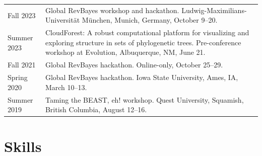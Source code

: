 \documentclass[10pt]{article}
\begin{document}
\begin{tabularx}{\textwidth}{>{\raggedleft\arraybackslash}p{2.2cm} X}
Fall 2023 & Global \textsf{RevBayes} workshop and hackathon. Ludwig-Maximilians-Universit\"{a}t M\"{u}nchen, Munich, Germany, October 9--20. \\[0.5cm]
Summer 2023 & CloudForest: A robust computational platform for visualizing and exploring structure in sets of phylogenetic trees. Pre-conference workshop at Evolution, Albuquerque, NM, June 21. \\[0.94cm]
Fall 2021 & Global \textsf{RevBayes} hackathon. Online-only, October 25--29. \\[0.1cm]
Spring 2020 & Global \textsf{RevBayes} hackathon. Iowa State University, Ames, IA, March 10--13. \\[0.1cm]
Summer 2019 & Taming the BEAST, eh! workshop. Quest University, Squamish, British Columbia, August 12--16.
\end{tabularx}

\section*{Skills}
\end{document}

